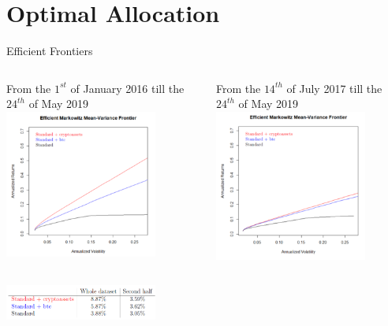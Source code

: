 \documentclass[aspectratio=169]{beamer}
\newcommand\Fontvi{\fontsize{8}{7.2}\selectfont}
\begin{document}
\section{Optimal Allocation}
\begin{frame}{Efficient Frontiers}
	\begin{columns}
		\begin{column}{0.5\textwidth}
		    \Fontvi{} From the $1^{st}$ of January 2016 till the $24^{th}$ of May 2019
		    \centering
			\includegraphics[width=5cm]{Images/effwhole}
		\end{column}
		\begin{column}{0.5\textwidth}
		    \Fontvi{} From the $14^{th}$ of July 2017 till the $24^{th}$ of May 2019
		    \centering
			\includegraphics[width=5cm]{Images/effhalf}
		\end{column}
	\end{columns}
	\begin{center}
	    \includegraphics[width=5cm]{Images/sharpe.png}
	\end{center}
\end{frame}









\end{document}
